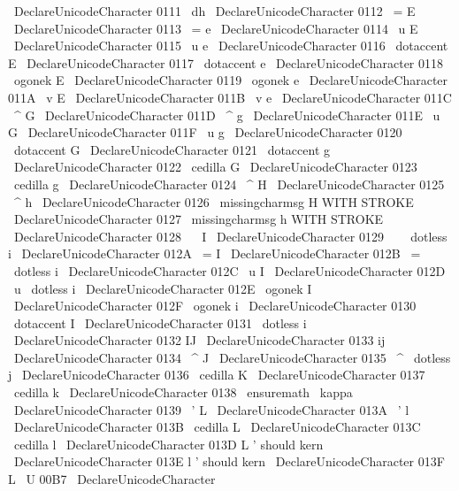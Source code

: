 {{{{{%
\
DeclareUnicodeCharacter
{
0111
}
{
\
dh
}
%
\
DeclareUnicodeCharacter
{
0112
}
{
\
=
E
}
%
\
DeclareUnicodeCharacter
{
0113
}
{
\
=
e
}
%
\
DeclareUnicodeCharacter
{
0114
}
{
\
u
{
E
}
}
%
\
DeclareUnicodeCharacter
{
0115
}
{
\
u
{
e
}
}
%
\
DeclareUnicodeCharacter
{
0116
}
{
\
dotaccent
{
E
}
}
%
\
DeclareUnicodeCharacter
{
0117
}
{
\
dotaccent
{
e
}
}
%
\
DeclareUnicodeCharacter
{
0118
}
{
\
ogonek
{
E
}
}
%
\
DeclareUnicodeCharacter
{
0119
}
{
\
ogonek
{
e
}
}
%
\
DeclareUnicodeCharacter
{
011A
}
{
\
v
{
E
}
}
%
\
DeclareUnicodeCharacter
{
011B
}
{
\
v
{
e
}
}
%
\
DeclareUnicodeCharacter
{
011C
}
{
\
^
G
}
%
\
DeclareUnicodeCharacter
{
011D
}
{
\
^
g
}
%
\
DeclareUnicodeCharacter
{
011E
}
{
\
u
{
G
}
}
%
\
DeclareUnicodeCharacter
{
011F
}
{
\
u
{
g
}
}
%
%
\
DeclareUnicodeCharacter
{
0120
}
{
\
dotaccent
{
G
}
}
%
\
DeclareUnicodeCharacter
{
0121
}
{
\
dotaccent
{
g
}
}
%
\
DeclareUnicodeCharacter
{
0122
}
{
\
cedilla
{
G
}
}
%
\
DeclareUnicodeCharacter
{
0123
}
{
\
cedilla
{
g
}
}
%
\
DeclareUnicodeCharacter
{
0124
}
{
\
^
H
}
%
\
DeclareUnicodeCharacter
{
0125
}
{
\
^
h
}
%
\
DeclareUnicodeCharacter
{
0126
}
{
\
missingcharmsg
{
H
WITH
STROKE
}
}
%
\
DeclareUnicodeCharacter
{
0127
}
{
\
missingcharmsg
{
h
WITH
STROKE
}
}
%
\
DeclareUnicodeCharacter
{
0128
}
{
\
~
I
}
%
\
DeclareUnicodeCharacter
{
0129
}
{
\
~
{
\
dotless
{
i
}
}
}
%
\
DeclareUnicodeCharacter
{
012A
}
{
\
=
I
}
%
\
DeclareUnicodeCharacter
{
012B
}
{
\
=
{
\
dotless
{
i
}
}
}
%
\
DeclareUnicodeCharacter
{
012C
}
{
\
u
{
I
}
}
%
\
DeclareUnicodeCharacter
{
012D
}
{
\
u
{
\
dotless
{
i
}
}
}
%
\
DeclareUnicodeCharacter
{
012E
}
{
\
ogonek
{
I
}
}
%
\
DeclareUnicodeCharacter
{
012F
}
{
\
ogonek
{
i
}
}
%
%
\
DeclareUnicodeCharacter
{
0130
}
{
\
dotaccent
{
I
}
}
%
\
DeclareUnicodeCharacter
{
0131
}
{
\
dotless
{
i
}
}
%
\
DeclareUnicodeCharacter
{
0132
}
{
IJ
}
%
\
DeclareUnicodeCharacter
{
0133
}
{
ij
}
%
\
DeclareUnicodeCharacter
{
0134
}
{
\
^
J
}
%
\
DeclareUnicodeCharacter
{
0135
}
{
\
^
{
\
dotless
{
j
}
}
}
%
\
DeclareUnicodeCharacter
{
0136
}
{
\
cedilla
{
K
}
}
%
\
DeclareUnicodeCharacter
{
0137
}
{
\
cedilla
{
k
}
}
%
\
DeclareUnicodeCharacter
{
0138
}
{
\
ensuremath
\
kappa
}
%
\
DeclareUnicodeCharacter
{
0139
}
{
\
'
L
}
%
\
DeclareUnicodeCharacter
{
013A
}
{
\
'
l
}
%
\
DeclareUnicodeCharacter
{
013B
}
{
\
cedilla
{
L
}
}
%
\
DeclareUnicodeCharacter
{
013C
}
{
\
cedilla
{
l
}
}
%
\
DeclareUnicodeCharacter
{
013D
}
{
L
'
}
%
should
kern
\
DeclareUnicodeCharacter
{
013E
}
{
l
'
}
%
should
kern
\
DeclareUnicodeCharacter
{
013F
}
{
L
\
U
{
00B7
}
}
%
%
\
DeclareUnicodeCharacter
}}}}}
